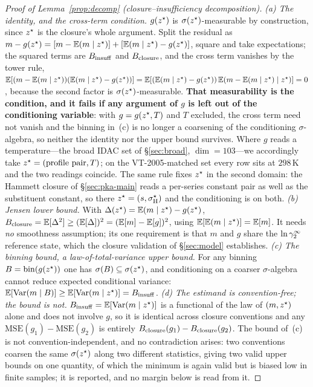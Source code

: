 \begin{proof}[Proof of Lemma~\ref{prop:decomp} (closure--insufficiency decomposition)]
\emph{(a) The identity, and the cross-term condition.} $g(z^\star)$ is $\sigma(z^\star)$-measurable by
construction, since $z^\star$ is the closure's whole argument. Split the residual as
$m-g(z^\star)=[m-\mathbb{E}(m\mid z^\star)]+[\mathbb{E}(m\mid z^\star)-g(z^\star)]$, square and take expectations; the
squared terms are $B_{\mathrm{insuff}}$ and $B_{\mathrm{closure}}$, and the cross term vanishes by the tower rule,
$\mathbb{E}[(m-\mathbb{E}(m\mid z^\star))(\mathbb{E}(m\mid z^\star)-g(z^\star))]
=\mathbb{E}[(\mathbb{E}(m\mid z^\star)-g(z^\star))\,\mathbb{E}(m-\mathbb{E}(m\mid z^\star)\mid z^\star)]=0$, because the second factor
is $\sigma(z^\star)$-measurable. \textbf{That measurability is the condition, and it fails if any
argument of $g$ is left out of the conditioning variable}: with $g=g(z^\star,T)$ and $T$ excluded,
the cross term need not vanish and the binning in~(c) is no longer a coarsening of the conditioning
$\sigma$-algebra, so neither the identity nor the upper bound survives. Where $g$ reads a
temperature---the broad IDAC set of \S\ref{sec:broad}, $\dim=103$---we accordingly take
$z^\star=(\text{profile pair},T)$; on the VT-2005-matched set every row sits at $298$\,K and the two
readings coincide. The same rule fixes $z^\star$ in the second domain: the Hammett closure of
\S\ref{sec:pka-main} reads a per-series constant pair as well as the substituent constant, so there
$z^\star=(s,\sigma_{\mathrm H}^\star)$ and the conditioning is on both.
\emph{(b) Jensen lower bound.} With $\Delta(z^\star)=\mathbb{E}(m\mid z^\star)-g(z^\star)$,
$B_{\mathrm{closure}}=\mathbb{E}[\Delta^2]\ge(\mathbb{E}[\Delta])^2=(\mathbb{E}[m]-\mathbb{E}[g])^2$, using $\mathbb{E}[\mathbb{E}(m\mid z^\star)]=\mathbb{E}[m]$.
It needs \emph{no} smoothness assumption; its one requirement is that $m$ and $g$ share the $\ln\gamma_2^\infty$
reference state, which the closure validation of \S\ref{sec:model} establishes.
\emph{(c) The binning bound, a law-of-total-variance upper bound.} For any binning
$B=\mathrm{bin}(g(z^\star))$ one has
$\sigma(B)\subseteq\sigma(z^\star)$, and conditioning on a coarser $\sigma$-algebra cannot reduce
expected conditional variance: $\mathbb{E}[\mathrm{Var}(m\mid B)]\ge\mathbb{E}[\mathrm{Var}(m\mid z^\star)]=B_{\mathrm{insuff}}$.
\emph{(d) The estimand is convention-free; the bound is not.}
$B_{\mathrm{insuff}}=\mathbb{E}[\mathrm{Var}(m\mid z^\star)]$ is a functional of the law of $(m,z^\star)$ alone and does not
involve $g$, so it is identical across closure conventions and any $\mathrm{MSE}(g_1)-\mathrm{MSE}(g_2)$
is entirely $B_{\mathrm{closure}}(g_1)-B_{\mathrm{closure}}(g_2)$. The bound of~(c) is not convention-independent, and no
contradiction arises: two conventions coarsen the same $\sigma(z^\star)$ along two different
statistics, giving two valid upper bounds on one quantity, of which the minimum is again valid but
is biased low in finite samples; it is reported, and no margin below is read from it.
\end{proof}

